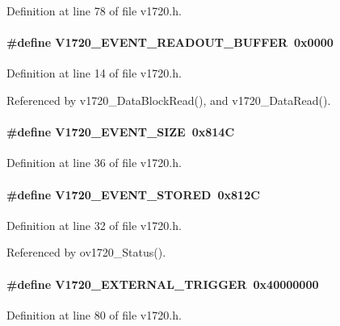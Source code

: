 Definition at line 78 of file v1720.h.
\paragraph[{V1720\_\-EVENT\_\-READOUT\_\-BUFFER}]{\setlength{\rightskip}{0pt plus 5cm}\#define V1720\_\-EVENT\_\-READOUT\_\-BUFFER~0x0000}\hfill\label{v1720_8h_a5fb4d5ccd4a115b9baffde67190b98a3}


Definition at line 14 of file v1720.h.

Referenced by v1720\_\-DataBlockRead(), and v1720\_\-DataRead().
\paragraph[{V1720\_\-EVENT\_\-SIZE}]{\setlength{\rightskip}{0pt plus 5cm}\#define V1720\_\-EVENT\_\-SIZE~0x814C}\hfill\label{v1720_8h_ae5e0d4abb5bf24ec3c8ee94bc8724afc}


Definition at line 36 of file v1720.h.
\paragraph[{V1720\_\-EVENT\_\-STORED}]{\setlength{\rightskip}{0pt plus 5cm}\#define V1720\_\-EVENT\_\-STORED~0x812C}\hfill\label{v1720_8h_a2e3db9aced421524373397e4d7d8f707}


Definition at line 32 of file v1720.h.

Referenced by ov1720\_\-Status().
\paragraph[{V1720\_\-EXTERNAL\_\-TRIGGER}]{\setlength{\rightskip}{0pt plus 5cm}\#define V1720\_\-EXTERNAL\_\-TRIGGER~0x40000000}\hfill\label{v1720_8h_a44885b1d2490a97a979601b28bd38c5f}


Definition at line 80 of file v1720.h.
